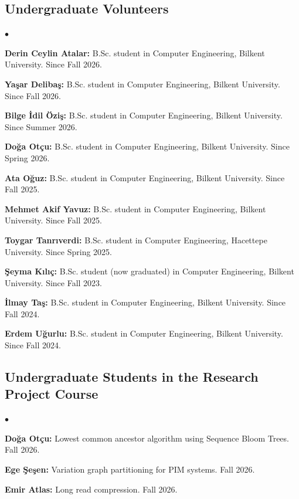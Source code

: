 \documentclass[margin,line]{res}
\newenvironment{list2}{
  \begin{list}{$\bullet$}{%
      \setlength{\itemsep}{0.1cm}
      \setlength{\parsep}{0in} \setlength{\parskip}{0in}
      \setlength{\topsep}{0in} \setlength{\partopsep}{0in} 
      \setlength{\leftmargin}{0.2in}}}{\end{list}}
\begin{document}
\begin{resume}
  \subsection{\small \sc Undergraduate Volunteers}
  \begin{list2}
\item \textbf{Derin Ceylin Atalar:} B.Sc. student in Computer Engineering,  Bilkent University. Since Fall 2026.
\item \textbf{Yaşar Delibaş:} B.Sc. student in Computer Engineering,  Bilkent University. Since Fall 2026.
\item  \textbf{Bilge İdil Öziş:} B.Sc. student in Computer Engineering,  Bilkent University. Since Summer 2026.
\item \textbf{Doğa Otçu:} B.Sc. student in Computer Engineering,  Bilkent University. Since Spring 2026.
\item \textbf{Ata Oğuz:} B.Sc. student in Computer Engineering,  Bilkent University. Since Fall 2025.
\item \textbf{Mehmet Akif Yavuz:} B.Sc. student in Computer Engineering,  Bilkent University. Since Fall 2025.
\item \textbf{Toygar Tanrıverdi:} B.Sc. student in Computer Engineering,  Hacettepe University. Since Spring 2025.
\item {\bf Şeyma Kılıç:} B.Sc. student (now graduated) in Computer Engineering,  Bilkent University. Since Fall 2023.
\item  \textbf{İlmay Taş:} B.Sc. student in Computer Engineering,  Bilkent University. Since Fall 2024.
\item  \textbf{Erdem Uğurlu:} B.Sc. student in Computer Engineering,  Bilkent University. Since Fall 2024.
\end{list2}

  

\vspace*{-.4cm}    
  \subsection{\small \sc Undergraduate Students in the Research Project Course}
\begin{list2}  
    \item {\bf Doğa Otçu:} Lowest common ancestor algorithm using Sequence Bloom Trees. Fall 2026.
    \item {\bf Ege Şeşen:} Variation graph partitioning for PIM systems. Fall 2026.
    \item {\bf Emir Atlas:} Long read compression. Fall 2026.
 \end{list2}


\end{resume}
\end{document}
